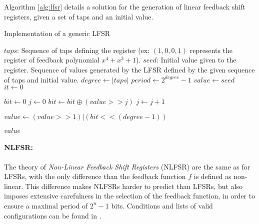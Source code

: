 \documentclass{llncs}
\begin{document}
Algorithm \ref{alg:lfsr} details a solution for the generation of linear feedback shift registers, given a set of taps and an initial value.

\begin{algorithm}[ht]
  \caption{Implementation of a generic LFSR}\label{alg:lfsr}
  \begin{algorithmic}[1]
    \Require
      \Statex $taps$: Sequence of taps defining the register (ex: $(1, 0, 0, 1)$ represents the register of feedback polynomial $x^4 + x^3 + 1$).
      \Statex $seed$: Initial value given to the register.
    \Ensure
      \Statex Sequence of values generated by the LFSR defined by the given sequence of taps and initial value.
    \Statex
    \State $degree \gets |taps|$ 
    \State $period \gets 2^{degree} - 1$ 
    \State $value \gets seed$ 
    \State $it \gets 0$
    
        \State $bit \gets 0$
        \State $j \gets 0$
            	\State $bit \gets bit \oplus (value >> j)$ 
            \EndIf
            \State $j \gets j+1$
    	\EndFor
        
        \State $value \gets (value >> 1) | (bit << (degree-1))$
        
        \Return $value$ 
    \EndWhile
  \end{algorithmic}
\end{algorithm}


\paragraph{NLFSR:}

The theory of \emph{Non-Linear Feedback Shift Registers} (NLFSR) are the same as for LFSRs, with the only difference than the feedback function $f$ is defined as non-linear\cite{joux}. This difference makes NLFSRs harder to predict than LFSRs, but also imposes extensive carefulness in the selection of the feedback function, in order to ensure a maximal period of $2^n-1$ bits. Conditions and lists of valid configurations can be found in \cite{dubro}.
\end{document}

